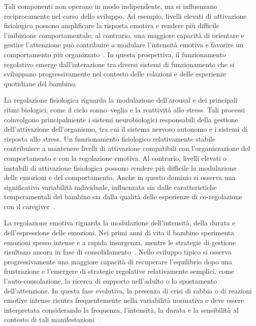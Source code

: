         Tali componenti non operano in modo indipendente, ma si influenzano reciprocamente nel corso dello sviluppo. Ad esempio, livelli elevati di attivazione fisiologica possono amplificare la risposta emotiva e rendere più difficile l'inibizione comportamentale; al contrario, una maggiore capacità di orientare e gestire l'attenzione può contribuire a modulare l'intensità emotiva e favorire un comportamento più organizzato~\cite{calkins2007,eisenberg2010}. In questa prospettiva, il funzionamento regolativo emerge dall'interazione tra diversi sistemi di funzionamento che si sviluppano progressivamente nel contesto delle relazioni e delle esperienze quotidiane del bambino.

        La regolazione fisiologica riguarda la modulazione dell'arousal e dei principali ritmi biologici, come il ciclo sonno--veglia e la reattività allo stress. Tali processi coinvolgono principalmente i sistemi neurobiologici responsabili della gestione dell'attivazione dell'organismo, tra cui il sistema nervoso autonomo e i sistemi di risposta allo stress. Un funzionamento fisiologico relativamente stabile contribuisce a mantenere livelli di attivazione compatibili con l'organizzazione del comportamento e con la regolazione emotiva. Al contrario, livelli elevati o instabili di attivazione fisiologica possono rendere più difficile la modulazione delle emozioni e del comportamento. Anche in questo dominio si osserva una significativa variabilità individuale, influenzata sia dalle caratteristiche temperamentali del bambino sia dalla qualità delle esperienze di co-regolazione con il caregiver~\cite{calkins2007hill,rothbart2006}.

        La regolazione emotiva riguarda la modulazione dell'intensità, della durata e dell'espressione delle emozioni. Nei primi anni di vita il bambino sperimenta emozioni spesso intense e a rapida insorgenza, mentre le strategie di gestione risultano ancora in fase di consolidamento~\cite{cole2004,calkins2007hill}. Nello sviluppo tipico si osserva progressivamente una maggiore capacità di recuperare l'equilibrio dopo una frustrazione e l'emergere di strategie regolative relativamente semplici, come l'auto-consolazione, la ricerca di supporto nell'adulto o lo spostamento dell'attenzione. In questa fase evolutiva, la presenza di crisi di rabbia o di reazioni emotive intense rientra frequentemente nella variabilità normativa e deve essere interpretata considerando la frequenza, l'intensità, la durata e la sensibilità al contesto di tali manifestazioni~\cite{eisenberg2010}.

